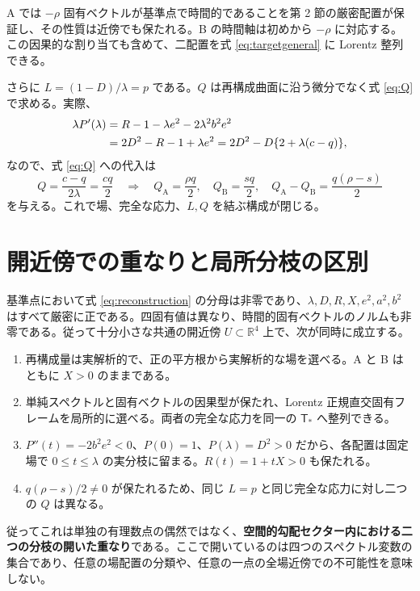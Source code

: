 \documentclass[11pt,a4paper]{article}
\newcommand{\Tmix}{\mathsf T}
\begin{document}
A では $-\rho$ 固有ベクトルが基準点で時間的であることを第 2 節の厳密配置が保証し、その性質は近傍でも保たれる。B の時間軸は初めから $-\rho$ に対応する。この因果的な割り当ても含めて、二配置を式 \eqref{eq:targetgeneral} に Lorentz 整列できる。

さらに $L=(1-D)/\lambda=p$ である。$Q$ は再構成曲面に沿う微分でなく式 \eqref{eq:Q} で求める。実際、
\begin{align}
\lambda P'(\lambda)
 &=R-1-\lambda e^2-2\lambda^2b^2e^2\notag\\
 &=2D^2-R-1+\lambda e^2
 =2D^2-D\{2+\lambda(c-q)\},\label{eq:derivative-id}
\end{align}
なので、式 \eqref{eq:Q} への代入は
\begin{equation}\label{eq:generalQ}
Q=\frac{c-q}{2\lambda}=\frac{cq}{2}
\quad\Longrightarrow\quad
Q_{\mathrm A}=\frac{\rho q}{2},\quad Q_{\mathrm B}=\frac{sq}{2},\quad
Q_{\mathrm A}-Q_{\mathrm B}=\frac{q(\rho-s)}2
\end{equation}
を与える。これで場、完全な応力、$L,Q$ を結ぶ構成が閉じる。

\newpage
\section{開近傍での重なりと局所分枝の区別}
基準点において式 \eqref{eq:reconstruction} の分母は非零であり、$\lambda,D,R,X,e^2,a^2,b^2$ はすべて厳密に正である。四固有値は異なり、時間的固有ベクトルのノルムも非零である。従って十分小さな共通の開近傍 $U\subset\mathbb R^4$ 上で、次が同時に成立する。
\begin{enumerate}
\item 再構成量は実解析的で、正の平方根から実解析的な場を選べる。A と B はともに $X>0$ のままである。
\item 単純スペクトルと固有ベクトルの因果型が保たれ、Lorentz 正規直交固有フレームを局所的に選べる。両者の完全な応力を同一の $\Tmix_*$ へ整列できる。
\item $P''(t)=-2b^2e^2<0$、$P(0)=1$、$P(\lambda)=D^2>0$ だから、各配置は固定場で $0\leq t\leq\lambda$ の実分枝に留まる。$R(t)=1+tX>0$ も保たれる。
\item $q(\rho-s)/2\ne0$ が保たれるため、同じ $L=p$ と同じ完全な応力に対し二つの $Q$ は異なる。
\end{enumerate}
従ってこれは単独の有理数点の偶然ではなく、\textbf{空間的勾配セクター内における二つの分枝の開いた重なり}である。ここで開いているのは四つのスペクトル変数の集合であり、任意の場配置の分類や、任意の一点の全場近傍での不可能性を意味しない。
\end{document}
